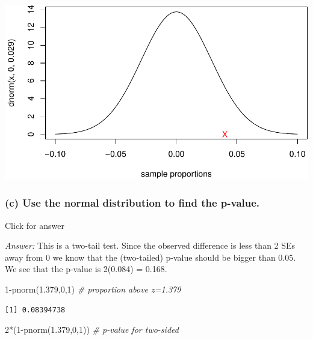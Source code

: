 \documentclass[
]{book}
\newenvironment{Shaded}{\begin{snugshade}}{\end{snugshade}}
\newcommand{\CommentTok}[1]{\textcolor[rgb]{0.56,0.35,0.01}{\textit{#1}}}
\newcommand{\DecValTok}[1]{\textcolor[rgb]{0.00,0.00,0.81}{#1}}
\newcommand{\FloatTok}[1]{\textcolor[rgb]{0.00,0.00,0.81}{#1}}
\newcommand{\FunctionTok}[1]{\textcolor[rgb]{0.00,0.00,0.00}{#1}}
\newcommand{\NormalTok}[1]{#1}
\newcommand{\SpecialCharTok}[1]{\textcolor[rgb]{0.00,0.00,0.00}{#1}}
\begin{document}
\includegraphics[width=1\linewidth]{Class_Activity_16_files/figure-latex/unnamed-chunk-6-1}

\hypertarget{c-use-the-normal-distribution-to-find-the-p-value.-1}{%
\subsubsection{(c) Use the normal distribution to find the p-value.}\label{c-use-the-normal-distribution-to-find-the-p-value.-1}}

Click for answer

\emph{Answer:} This is a two-tail test. Since the observed difference is less than 2 SEs away from 0 we know that the (two-tailed) p-value should be bigger than 0.05. We see that the p-value is 2(0.084) = 0.168.

\begin{Shaded}
\begin{Highlighting}[]
\DecValTok{1}\SpecialCharTok{{-}}\FunctionTok{pnorm}\NormalTok{(}\FloatTok{1.379}\NormalTok{,}\DecValTok{0}\NormalTok{,}\DecValTok{1}\NormalTok{) }\CommentTok{\# proportion above z=1.379}
\end{Highlighting}
\end{Shaded}

\begin{verbatim}
[1] 0.08394738
\end{verbatim}

\begin{Shaded}
\begin{Highlighting}[]
\DecValTok{2}\SpecialCharTok{*}\NormalTok{(}\DecValTok{1}\SpecialCharTok{{-}}\FunctionTok{pnorm}\NormalTok{(}\FloatTok{1.379}\NormalTok{,}\DecValTok{0}\NormalTok{,}\DecValTok{1}\NormalTok{)) }\CommentTok{\# p{-}value for two{-}sided}
\end{Highlighting}
\end{Shaded}
\end{document}
